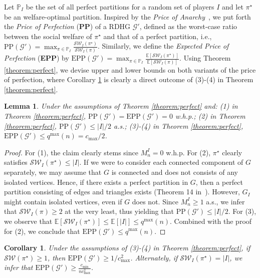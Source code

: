 \documentclass[letterpaper]{article}
\newtheorem{lemma}{Lemma}
\newtheorem{corollary}{Corollary}
\begin{document}
Let $\mathbb{P}_I$ be the set of all perfect partitions for a random set of players $I$ and let $\pi^\star$ be an welfare-optimal partition. Inspired by the \textit{Price of Anarchy}~\cite{koutsoupias1999worst}, we put forth the \textit{Price of Perfection} (\textbf{PP}) of a RDHG $\mathcal{G}'$, defined as the worst-case ratio between the social welfare of $\pi^\star$ and that of a perfect partition, i.e., $\text{PP}(\mathcal{G}') = \max_{\pi \in \mathbb{P}_I} \frac{\mathcal{SW}_I(\pi^\star)}{\mathcal{SW}_I(\pi)}$. Similarly, we define the \textit{Expected Price of Perfection} (\textbf{EPP}) by $\text{EPP}(\mathcal{G}') = \max_{\pi \in \mathbb{P}_I} \frac{\mathbb{E}[\mathcal{SW}_I(\pi^\star)]}{\mathbb{E}[\mathcal{SW}_I(\pi)]}$. Using Theorem \ref{theorem:perfect}, we devise upper and lower bounds on both variants of the price of perfection, where Corollary \ref{corollary:almost-sure-lower-bound} is clearly a direct outcome of (3)-(4) in Theorem \ref{theorem:perfect}.
\begin{lemma}
\label{lemma:almost-sure-upper-bound}
Under the assumptions of Theorem \ref{theorem:perfect} and: (1) in Theorem \ref{theorem:perfect}, $\text{PP}(\mathcal{G}') = \text{EPP}(\mathcal{G}') = 0$ w.h.p.; (2) in Theorem \ref{theorem:perfect}, $\text{PP}(\mathcal{G}') \leq |I|/2$ a.s.; (3)-(4) in Theorem \ref{theorem:perfect}, $\text{EPP}(\mathcal{G}') \leq q^{\max}(n) = c_{\max}/2$.
\end{lemma}
\begin{proof}
For (1), the claim clearly stems since $M_n^I = 0$ w.h.p. For (2), $\pi^\star$ clearly satisfies $\mathcal{SW}_I(\pi^\star) \leq |I|$. If we were to consider each connected component of $G$ separately, we may assume that $G$ is connected and does not consists of any isolated vertices. Hence, if there exists a perfect partition in $G$, then a perfect partition consisting of edges and triangles exists (Theorem 14 in~\cite{peters2016complexity}). However, $G_I$ might contain isolated vertices, even if $G$ does not. Since $M_n^I \geq 1$ a.s., we infer that $\mathcal{SW}_I(\pi) \geq 2$ at the very least, thus yielding that $\text{PP}(\mathcal{G}') \leq |I|/2$. For (3), we observe that $\mathbb{E}[\mathcal{SW}_I(\pi^\star)] \leq \mathbb{E}[|I|] \leq q^{\max}(n)$. Combined with the proof for (2), we conclude that $\text{EPP}(\mathcal{G}') \leq q^{\max}(n)$.
\end{proof}
\begin{corollary}
\label{corollary:almost-sure-lower-bound}
Under the assumptions of (3)-(4) in Theorem \ref{theorem:perfect}, if $\mathcal{SW}(\pi^\star) \geq 1$, then $\text{EPP}(\mathcal{G}') \geq 1 / c_{\max}^2$. Alternately, if $\mathcal{SW}_I(\pi^\star) = |I|$, we infer that $\text{EPP}(\mathcal{G}') \geq \frac{c_{\min}}{n c_{\max}^2}$.
\end{corollary}
\end{document}
